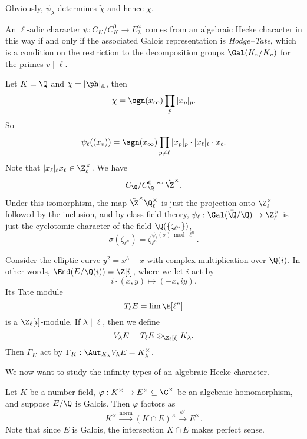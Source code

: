 \documentclass[a4paper]{article}
\newcommand\A{\mathbb{A}}
\begin{document}
Obviously, $\psi_\lambda$ determines $\tilde{\chi}$ and hence $\chi$.
\begin{fact}
  An $\ell$-adic character $\psi: C_K/C_K^0 \to E_\lambda^\times$ comes from an algebraic Hecke character in this way if and only if the associated Galois representation is \emph{Hodge--Tate}, which is a condition on the restriction to the decomposition groups $\Gal(\bar{K}_v/K_v)$ for the primes $v \mid \ell$.
\end{fact}

\begin{eg}
  Let $K = \Q$ and $\chi = |\ph |_{\A}$, then
  \[
    \tilde{\chi} = \sgn(x_\infty) \prod_p |x_p|_p.
  \]
  So
  \[
    \psi_\ell((x_v)) = \sgn(x_\infty) \prod_{p \not= \ell} |x_p|_p \cdot |x_\ell|_{\ell} \cdot x_\ell.
  \]
  Note that $|x_\ell|_{\ell} x_\ell \in \Z_\ell^\times$. We have
  \[
    C_\Q/C_\Q^0 \cong \hat{\Z}^\times.
  \]
  Under this isomorphism, the map $\hat{\Z}^\times \Q_\ell^\times$ is just the projection onto $\Z_\ell^\times$ followed by the inclusion, and by class field theory, $\psi_\ell: \Gal(\bar{\Q}/\Q) \to \Z_\ell^\times$ is just the cyclotomic character of the field $\Q(\{\zeta_{\ell^n}\})$,
  \[
    \sigma(\zeta_{\ell^n}) = \zeta_{\ell^n} ^{\psi_\ell(\sigma) \bmod \ell^n}.
  \]
\end{eg}

\begin{eg}
  Consider the elliptic curve $y^2 = x^3 - x$ with complex multiplication over $\Q(i)$. In other words, $\End(E/\Q(i)) = \Z[i]$, where we let $i$ act by
  \[
    i \cdot (x, y) \mapsto (-x, iy).
  \]
  Its Tate module
  \[
    T_\ell E = \lim \E[\ell^n]
  \]
  is a $\Z_\ell [i]$-module. If $\lambda \mid \ell$, then we define
  \[
    V_\lambda E = T_\ell E \otimes_{\Z_{\ell}[i]} K_\lambda.
  \]
  Then $\Gamma_K$ act by $\Gamma_K: \Aut_{K_\lambda} V_\lambda E = K_\lambda^\times$.
\end{eg}

We now want to study the infinity types of an algebraic Hecke character.
\begin{lemma}
  Let $K$ be a number field, $\varphi: K^\times \to E^\times \subseteq \C^\times$ be an algebraic homomorphism, and suppose $E/\Q$ is Galois. Then $\varphi$ factors as
  \[
    K^\times \overset{\mathrm{norm}}{\longrightarrow} (K \cap E)^\times \overset{\phi'}{\longrightarrow} E^\times.
  \]
  Note that since $E$ is Galois, the intersection $K \cap E$ makes perfect sense.
\end{lemma}
\end{document}

